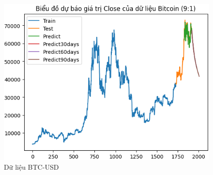 \documentclass[conference]{IEEEtran}
\begin{document}
\begin{figure}[H]
\begin{minipage}{0.15\textwidth}
			\includegraphics[width=1\textwidth]{Figure/RNN_BTC91.png}
		\end{minipage}
		\caption{Dữ liệu BTC-USD}
		\label{fig:1}
	\end{figure}
	
\end{document}
